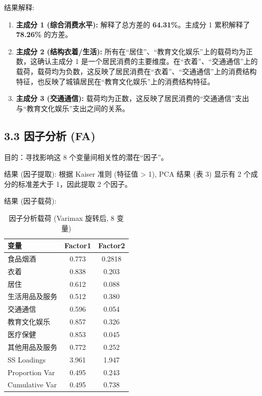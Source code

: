 \documentclass[12pt, a4paper]{article}
\begin{document}
\noindent 结果解释:
\begin{enumerate}
    \item \textbf{主成分 1 (综合消费水平):} 解释了总方差的 \textbf{64.31\%}。主成分 1 累积解释了 \textbf{78.26\%} 的方差。
    \item \textbf{主成分 2 (结构衣着/生活):} 所有在“居住”、“教育文化娱乐”上的载荷均为正数，这确认主成分 1 是一个居民消费的主要维度。在“衣着”、“交通通信”上的载荷，载荷均为负数，这反映了居民消费在“衣着”、“交通通信”上的消费结构特征，也反映了城镇居民在“教育文化娱乐”上的消费结构特征。
    \item \textbf{主成分 3 (交通通信):} 载荷均为正数，这反映了居民消费的“交通通信”支出与“教育文化娱乐”支出之间的关系。
\end{enumerate}

\subsection*{3.3 因子分析 (FA)}
\noindent 目的：寻找影响这 8 个变量间相关性的潜在“因子”。

\noindent 结果 (因子提取): 根据 Kaiser 准则 (特征值 > 1), PCA 结果 (表 3) 显示有 2 个成分的标准差大于 1，因此提取 2 个因子。

\noindent 结果 (因子载荷):
\begin{table}[H]
    \centering
    \caption{因子分析载荷 (Varimax 旋转后, 8 变量)}
    \label{tab:factor_loadings_full}
    \begin{tabularx}{\textwidth}{X|c|c}
        \toprule
        \textbf{变量} & \textbf{Factor1} & \textbf{Factor2} \\
        \midrule
        食品烟酒 & 0.773 & 0.2818 \\
        衣着 & 0.838 & 0.203 \\
        居住 & 0.612 & 0.088 \\
        生活用品及服务 & 0.512 & 0.380 \\
        交通通信 & 0.596 & 0.054 \\
        教育文化娱乐 & 0.857 & 0.326 \\
        医疗保健 & 0.853 & 0.045 \\
        其他用品及服务 & 0.772 & 0.252 \\
        \midrule
        SS Loadings & 3.961 & 1.947 \\
        Proportion Var & 0.495 & 0.243 \\
        Cumulative Var & 0.495 & 0.738 \\
        \bottomrule
    \end{tabularx}
\end{table}
\end{document}
